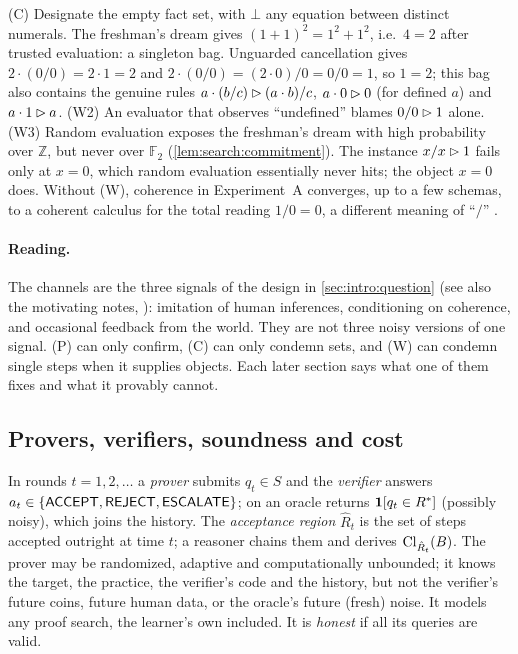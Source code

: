 \begin{example}\label{ex:setting:alg2}
(C) Designate the empty fact set, with $\bot$ any equation between distinct
numerals. The freshman's dream gives $(1+1)^2=1^2+1^2$, i.e.\ $4=2$ after trusted
evaluation: a singleton bag. Unguarded cancellation gives $2\cdot(0/0)=2\cdot1=2$
and $2\cdot(0/0)=(2\cdot0)/0=0/0=1$, so $1=2$; this bag also contains the genuine
rules $a\cdot(b/c)\rhd(a\cdot b)/c$, $a\cdot0\rhd0$ (for defined $a$) and
$a\cdot1\rhd a$. (W2) An evaluator that observes ``undefined'' blames
$0/0\rhd1$ alone. (W3) Random evaluation exposes the freshman's dream with high
probability over $\mathbb Z$, but never over $\mathbb F_2$
(\cref{lem:search:commitment}). The instance $x/x\rhd1$ fails only at $x=0$,
which random evaluation essentially never hits; the object $x=0$ does. Without (W), coherence in Experiment~A
converges, up to a few schemas, to a coherent calculus for the total reading
$1/0=0$, a different meaning of ``$/$'' .
\end{example}

\paragraph{Reading.} The channels are the three signals of the design in
\cref{sec:intro:question} (see also the motivating notes,
\citealp{hanni2026notes}): imitation of human inferences, conditioning on
coherence, and occasional feedback from the world. They are not three noisy
versions of one signal. (P) can only confirm, (C) can only condemn sets, and (W)
can condemn single steps when it supplies objects. Each later section says what
one of them fixes and what it provably cannot.

\subsection{Provers, verifiers, soundness and cost}\label{sec:setting:protocol}

\begin{definition}[Protocol]\label{def:setting:protocol}
In rounds $t=1,2,\dots$ a \emph{prover} submits $q_t\in S$ and the
\emph{verifier} answers $a_t\in\{\textsf{ACCEPT},\textsf{REJECT},\textsf{ESCALATE}\}$; on \ESCALATE{} an
oracle returns $\mathbf 1[q_t\in R^{*}]$ (possibly noisy), which joins the
history. The \emph{acceptance region} $\hat R_t$ is the set of steps accepted
outright at time $t$; a reasoner chains them and derives $\mathrm{Cl}_{\hat R_t}(B)$. The
prover may be randomized, adaptive and computationally unbounded; it knows the
target, the practice, the verifier's code and the history, but not the verifier's
future coins, future human data, or the oracle's future (fresh) noise. It models
any proof search, the learner's own included. It is \emph{honest} if all its
queries are valid.
\end{definition}

